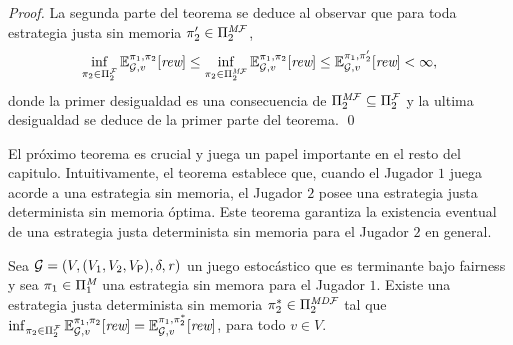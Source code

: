 \begin{proof}
  
  La segunda parte del teorema se deduce al observar que para toda estrategia justa sin memoria $\pi_{2}' \in \Pi^{\textit{M}\mathcal{F}}_{2}$,
  \[\inf_{\pi_{2} \in \Pi^{\mathcal{F}}_{2}} \mathbb{E}^{\pi_{1}, \pi_{2}}_{\mathcal{G},v}[\textit{rew}]
  \leq \inf_{\pi_{2} \in \Pi^{\textit{M}\mathcal{F}}_{2}} \mathbb{E}^{\pi_{1}, \pi_{2}}_{\mathcal{G},v}[\textit{rew}]
  \leq \mathbb{E}^{\pi_{1}, \pi_{2}'}_{\mathcal{G},v}[\textit{rew}] < \infty,\]
  donde la primer desigualdad es una consecuencia de
  $\Pi^{\textit{M}\mathcal{F}}_{2}\subseteq\Pi^{\mathcal{F}}_{2}$ y la ultima desigualdad
  se deduce de la primer parte del teorema.  \qed
\end{proof}

El próximo teorema es crucial y juega un papel importante en el resto del capitulo.  Intuitivamente, el teorema establece que, cuando el Jugador $1$ juega acorde a una estrategia sin memoria, el Jugador $2$ posee una estrategia justa determinista sin memoria óptima.
%
Este teorema garantiza la existencia eventual de una estrategia justa determinista sin memoria para el Jugador $2$ en general.
%
\begin{theorem}\label{th:infima-in-dmf}%
  Sea $\mathcal{G}= (V, (V_1, V_2, V_{\mathsf{P}}), \delta, \mathit{r})$ un
  juego estocástico que es terminante bajo fairness y sea
  $\pi_{1} \in \Pi^{\textit{M}}_{1}$ una estrategia sin memora para el Jugador $1$.  Existe una estrategia justa determinista sin memoria
  $\pi^*_{2}\in\Pi^{\textit{MD}\mathcal{F}}_{2}$ tal que
  $\inf_{\pi_{2} \in \Pi^{\mathcal{F}}_{2}} \mathbb{E}^{\pi_{1}, \pi_{2}}_{\mathcal{G},v}[\textit{rew}]
   =
   \mathbb{E}^{\pi_{1}, \pi^*_{2}}_{\mathcal{G},v}[\textit{rew}]$, para todo $v \in V$.
\end{theorem}
%
\iffalse
